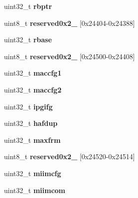 \begin{DoxyCompactItemize}
uint32\+\_\+t {\bfseries rbptr}
\item 
\mbox{\label{structtsec__registers_a34b2a308085b9fc3f61edd6314ec0ceb}} 
uint8\+\_\+t {\bfseries reserved0x2\+\_} \mbox{[}0x24404-\/0x24388\mbox{]}
\item 
\mbox{\label{structtsec__registers_a6bd11dba238a1c8668005b0be4a8f14b}} 
uint32\+\_\+t {\bfseries rbase}
\item 
\mbox{\label{structtsec__registers_afc029caac6222f5f43a9345bb61e25ed}} 
uint8\+\_\+t {\bfseries reserved0x2\+\_} \mbox{[}0x24500-\/0x24408\mbox{]}
\item 
\mbox{\label{structtsec__registers_adb5fcddcc200a301d15bc07e5ed1a7e2}} 
uint32\+\_\+t {\bfseries maccfg1}
\item 
\mbox{\label{structtsec__registers_a864f5473246743fb043a700da327f7c9}} 
uint32\+\_\+t {\bfseries maccfg2}
\item 
\mbox{\label{structtsec__registers_ac5c44eb871176232a7e2a6c97dd7c823}} 
uint32\+\_\+t {\bfseries ipgifg}
\item 
\mbox{\label{structtsec__registers_a500c4ef8de2e0646a4ff256d3b1f38d6}} 
uint32\+\_\+t {\bfseries hafdup}
\item 
\mbox{\label{structtsec__registers_a5a4348179b7071cd2aad3193488dc0a4}} 
uint32\+\_\+t {\bfseries maxfrm}
\item 
\mbox{\label{structtsec__registers_a247c1b87fa5ff49ac6bb06de30b75ed2}} 
uint8\+\_\+t {\bfseries reserved0x2\+\_} \mbox{[}0x24520-\/0x24514\mbox{]}
\item 
\mbox{\label{structtsec__registers_aeac1ca88ca253aaf1ebb16da5af72776}} 
uint32\+\_\+t {\bfseries miimcfg}
\item 
\mbox{\label{structtsec__registers_a2fd0571c7de01a4413cd9361029d9759}} 
uint32\+\_\+t {\bfseries miimcom}

\end{DoxyCompactItemize}
